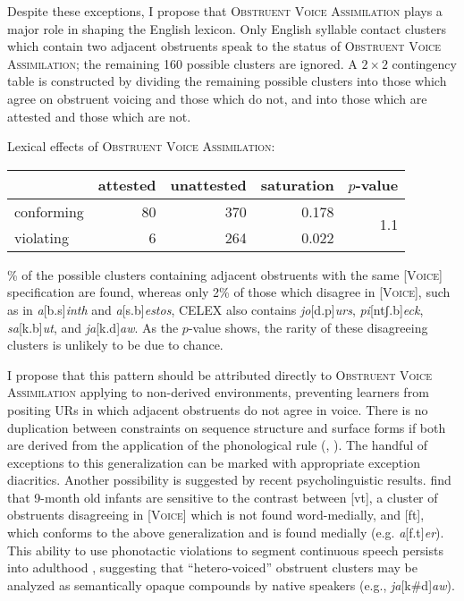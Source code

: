 Despite these exceptions, I propose that \textsc{Obstruent Voice Assimilation} plays a major role in shaping the English lexicon. Only English syllable contact clusters which contain two adjacent obstruents speak to the status of \textsc{Obstruent Voice Assimilation}; the remaining 160 possible clusters are ignored.
A $2 \times 2$ contingency table is constructed by dividing the remaining possible clusters into those which agree on obstruent voicing and those which do not, 
and into those which are attested and those which are not.

\ex Lexical effects of \textsc{Obstruent Voice Assimilation}: \vspace{6pt} \\
\begin{tabular}{l r r r r}
\toprule
           & attested & unattested & saturation & $p$-value \\
\midrule
conforming & 80 & 370 & 0.178 & \multirow{2}{*}{1.1\e{-11}}\\
violating  &  6 & 264 & 0.022 \\
\bottomrule
\end{tabular}
\xe

\% of the possible clusters containing adjacent obstruents with the same [\textsc{Voice}] specification are found, 
whereas only 2\%  of those which disagree in [\textsc{Voice}], 
such as in \emph{a}[b.s]\emph{inth} and \emph{a}[s.b]\emph{estos}, 
CELEX also contains \emph{jo}[d.p]\emph{urs}, \emph{pi}[ntʃ.b]\emph{eck}, \emph{sa}[k.b]\emph{ut}, and \emph{ja}[k.d]\emph{aw}. 
As the $p$-value shows, 
the rarity of these disagreeing clusters is unlikely to be due to chance. 

I propose that this pattern should be attributed directly to \textsc{Obstruent Voice Assimilation} applying to non-derived environments, preventing learners from positing URs in which adjacent obstruents do not agree in voice. There is no duplication between constraints on sequence structure and surface forms if both are derived from the application of the phonological rule (\citealt[][401f.]{Stanley1967}, \citealt[][382]{SPE}). The handful of exceptions to this generalization can be marked with appropriate exception diacritics. Another possibility is suggested by recent psycholinguistic results. \citet{Mattys2001b} find that 9-month old infants are sensitive to the contrast between [vt], a cluster of obstruents disagreeing in [\textsc{Voice}] which is not found word-medially, and [ft], which conforms to the above generalization and is found medially (e.g. \emph{a}[f.t]\emph{er}). This ability to use phonotactic violations to segment continuous speech persists into adulthood \citep{McQueen1998}, suggesting that ``hetero-voiced'' obstruent clusters may be analyzed as semantically opaque compounds by native speakers (e.g., \emph{ja}[k\#d]\emph{aw}). 

